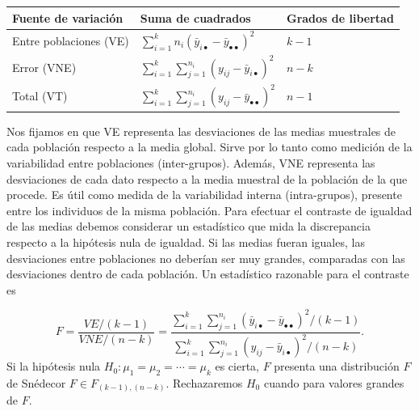 \documentclass[
  a4paper,
  oneside]{scrbook}
\newcounter{none} %
\theoremstyle{definition}
\theoremstyle{definition}
\theoremstyle{definition}
\theoremstyle{definition}
\theoremstyle{remark}
\begin{document}
{\def\LTcaptype{none} %
\begin{longtable}[]{@{}
  >{\centering\arraybackslash}p{}
  >{\centering\arraybackslash}p{}
  >{\centering\arraybackslash}p{}@{}}
\toprule\noalign{}
\begin{minipage}[b]{\linewidth}\centering
Fuente de variación
\end{minipage} & \begin{minipage}[b]{\linewidth}\centering
Suma de cuadrados
\end{minipage} & \begin{minipage}[b]{\linewidth}\centering
Grados de libertad
\end{minipage} \\
\midrule\noalign{}
\endhead
\bottomrule\noalign{}
\endlastfoot
Entre poblaciones (VE) & \({\sum_{i=1}^k {n_i} \left(\bar y_{i\bullet}-\bar y_{\bullet\bullet}\right)^2}\) & \(k-1\) \\
Error (VNE) & \({\sum_{i=1}^k \sum_{j=1}^{n_i} \left( y_{ij}-\bar y_{i\bullet}\right)^2}\) & \(n-k\) \\
Total (VT) & \({\sum_{i=1}^k \sum_{j=1}^{n_i} \left( y_{ij}-\bar y_{\bullet\bullet}\right)^2}\) & \(n-1\) \\
\end{longtable}
}

Nos fijamos en que VE representa las desviaciones de las medias
muestrales de cada población respecto a la media global. Sirve por lo
tanto como medición de la variabilidad entre poblaciones (inter-grupos).
Además, VNE representa las desviaciones de cada dato respecto a la media
muestral de la población de la que procede. Es útil como medida de la
variabilidad interna (intra-grupos), presente entre los individuos de la
misma población. Para efectuar el contraste de igualdad de las medias
debemos considerar un estadístico que mida la discrepancia respecto a la
hipótesis nula de igualdad. Si las medias fueran iguales, las
desviaciones entre poblaciones no deberían ser muy grandes, comparadas
con las desviaciones dentro de cada población. Un estadístico razonable
para el contraste es

\[F=\frac{VE/(k-1)}{{VNE}/(n-k)}=\frac{\sum_{i=1}^k \sum_{j=1}^{n_i} \left(\bar y_{i\bullet}-\bar y_{\bullet\bullet}\right)^2/(k-1)}
{\sum_{i=1}^k \sum_{j=1}^{n_i} \left( y_{ij}-\bar y_{i\bullet}\right)^2/(n-k)}.\]
Si la hipótesis nula \(H_0: \mu_1=\mu_2=\cdots=\mu_k\) es cierta, \(F\)
presenta una distribución \(F\) de Snédecor \(F\in F_{(k-1),(n-k)}\).
Rechazaremos \(H_0\) cuando para valores grandes de \(F\).
\end{document}
